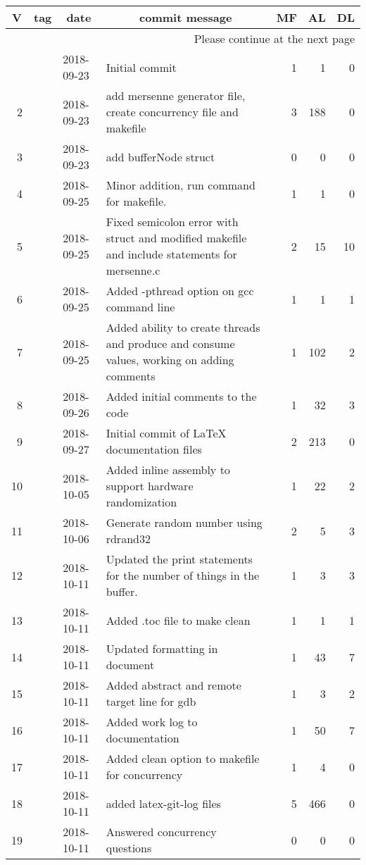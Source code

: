 \documentclass[10pt,a4paper,english]{article}
\newcommand{\longtableendfoot}{Please continue at the next page}
\begin{document}
\begin{longtable}{|rllp{9cm}rrr|}
\hline \multicolumn{1}{|c}{\textbf{V}} & \multicolumn{1}{c}{\textbf{tag}}
& \multicolumn{1}{c}{\textbf{date}}
& \multicolumn{1}{c}{\textbf{commit message}} & \multicolumn{1}{c}{\textbf{MF}}
& \multicolumn{1}{c}{\textbf{AL}} & \multicolumn{1}{c|}{\textbf{DL}} \\ \hline
\endhead

\hline \multicolumn{7}{|r|}{\longtableendfoot} \\ \hline
\endfoot

\hline%
\endlastfoot

\hline 1 &  & 2018-09-23 & Initial commit & 1 & 1 & 0 \\
\hline 2 &  & 2018-09-23 & add mersenne generator file, create concurrency file and makefile & 3 & 188 & 0 \\
\hline 3 &  & 2018-09-23 & add bufferNode struct & 0 & 0 & 0 \\
\hline 4 &  & 2018-09-25 & Minor addition, run command for makefile. & 1 & 1 & 0 \\
\hline 5 &  & 2018-09-25 & Fixed semicolon error with struct and modified makefile and include statements for mersenne.c & 2 & 15 & 10 \\
\hline 6 &  & 2018-09-25 & Added -pthread option on gcc command line & 1 & 1 & 1 \\
\hline 7 &  & 2018-09-25 & Added ability to create threads and produce and consume values, working on adding comments & 1 & 102 & 2 \\
\hline 8 &  & 2018-09-26 & Added initial comments to the code & 1 & 32 & 3 \\
\hline 9 &  & 2018-09-27 & Initial commit of LaTeX documentation files & 2 & 213 & 0 \\
\hline 10 &  & 2018-10-05 & Added inline assembly to support hardware randomization & 1 & 22 & 2 \\
\hline 11 &  & 2018-10-06 & Generate random number using rdrand32 & 2 & 5 & 3 \\
\hline 12 &  & 2018-10-11 & Updated the print statements for the number of things in the buffer. & 1 & 3 & 3 \\
\hline 13 &  & 2018-10-11 & Added .toc file to make clean & 1 & 1 & 1 \\
\hline 14 &  & 2018-10-11 & Updated formatting in document & 1 & 43 & 7 \\
\hline 15 &  & 2018-10-11 & Added abstract and remote target line for gdb & 1 & 3 & 2 \\
\hline 16 &  & 2018-10-11 & Added work log to documentation & 1 & 50 & 7 \\
\hline 17 &  & 2018-10-11 & Added clean option to makefile for concurrency & 1 & 4 & 0 \\
\hline 18 &  & 2018-10-11 & added latex-git-log files & 5 & 466 & 0 \\
\hline 19 &  & 2018-10-11 & Answered concurrency questions & 0 & 0 & 0 \\
\end{longtable}
\end{document}
